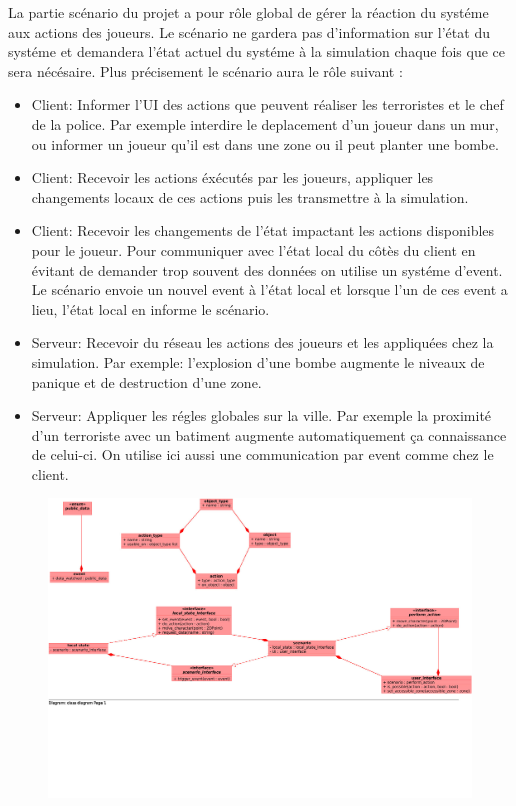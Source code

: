 \documentclass[a4paper,10pt]{article}
\begin{document}
La partie scénario du projet a pour rôle global de gérer la réaction du systéme aux actions des joueurs. Le scénario ne gardera pas d'information sur l'état du systéme et demandera l'état actuel du systéme à la simulation chaque fois que ce sera nécésaire. Plus précisement le scénario aura le rôle suivant :
\begin{itemize}
\item Client: Informer l'UI des actions que peuvent réaliser les terroristes et le chef de la police. Par exemple interdire le deplacement d'un joueur dans un mur, ou informer un joueur qu'il est dans une zone ou il peut planter une bombe. 
\item Client: Recevoir les actions éxécutés par les joueurs, appliquer les changements locaux de ces actions puis les transmettre à la simulation.
\item Client: Recevoir les changements de l'état impactant les actions disponibles pour le joueur. Pour communiquer avec l'état local du côtès du client en évitant de demander trop souvent des données on utilise un systéme d'event. Le scénario envoie un nouvel event à l'état local et lorsque l'un de ces event a lieu, l'état local en informe le scénario.
\item Serveur: Recevoir du réseau les actions des joueurs et les appliquées chez la simulation. Par exemple: l'explosion d'une bombe augmente le niveaux de panique et de destruction d'une zone.
\item Serveur: Appliquer les régles globales sur la ville. Par exemple la proximité d'un terroriste avec un batiment augmente automatiquement ça connaissance de celui-ci. On utilise ici aussi une communication par event comme chez le client.
\end{itemize}

\begin{figure}[h]
\centering
\includegraphics[width = \linewidth]{./scenario-interface.jpg}
\end{figure}
\end{document}
